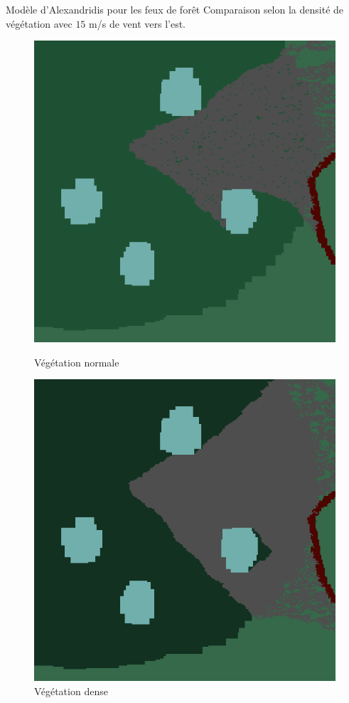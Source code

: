 \documentclass{beamer}
\begin{document}
\begin{frame}{Modèle d'Alexandridis pour les feux de forêt \hyperlink{jump}{\beamerbutton{ }} \hypertarget{10}{\beamerbutton{ }}}
    Comparaison selon la densité de végétation avec $15$ m/s de vent vers l'est.

    \begin{figure}[!htb]
        \begin{minipage}{0.48\textwidth}
          \centering
          \includegraphics[width=.8\linewidth]{pictures/model2/land_200_wind_notdense.png}
          \caption{Végétation normale}\label{Fig:Data1}
        \end{minipage}\hfill
        \begin{minipage}{0.48\textwidth}
          \centering
          \includegraphics[width=.8\linewidth]{pictures/model2/land_200_wind_dense.png}
          \caption{Végétation dense}\label{Fig:Data2}
        \end{minipage}
     \end{figure}
\end{frame}
\end{document}
